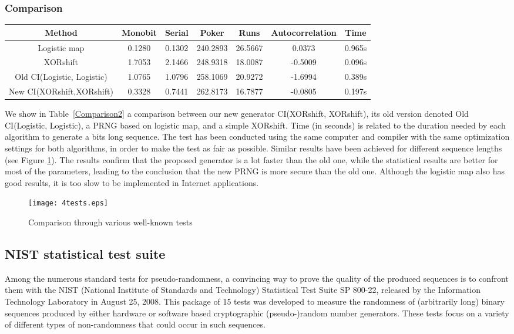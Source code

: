 \documentclass[10pt, a4paper, conference, compsocconf]{IEEEtran}
\begin{document}
\subsubsection{Comparison}
\begin{table*}[!t]
\renewcommand{\arraystretch}{1.3}
\caption{Comparison with Old CI(Logistic, Logistic) for a  bits sequence}
\label{Comparison2}
\centering
  \begin{tabular}{ccccccc}
    \hline
Method & Monobit & Serial & Poker & Runs & Autocorrelation & Time  \\ \hline
Logistic map &0.1280&0.1302&240.2893&26.5667&0.0373&0.965s \\
XORshift &1.7053&2.1466&248.9318&18.0087&-0.5009&0.096s \\
Old CI(Logistic, Logistic) &1.0765&1.0796&258.1069&20.9272&-1.6994&0.389s \\
New CI(XORshift,XORshift) &0.3328&0.7441&262.8173&16.7877&-0.0805&0.197s\\
    \hline
  \end{tabular}
\end{table*}
We show in Table~\ref{Comparison2} a comparison between our new generator CI(XORshift, XORshift), its old version denoted Old CI(Logistic, Logistic), a PRNG based on logistic map, and a simple XORshift. Time (in seconds) is related to the duration needed by each algorithm to generate a  bits long sequence. The test has been conducted using the same computer and compiler with the same optimization settings for both algorithms, in order to make the test as fair as possible. Similar results have been achieved for different sequence lengths (see Figure \ref{Comparison1}).
The results confirm that the proposed generator is a lot faster than the old one, while the statistical results are better for most of the parameters, leading to the conclusion that the new PRNG is more secure than the old one. Although the logistic map also has good results, it is too slow to be implemented in Internet applications.


\begin{figure}
\centering
\texttt{[image: 4tests.eps]}
\caption{Comparison through various well-known tests}
\label{Comparison1}
\end{figure}


\subsection{NIST statistical test suite}
Among the numerous standard tests for pseudo-randomness, a convincing way to prove the quality of the produced sequences is to confront them with the NIST (National Institute of  Standards and Technology) Statistical Test Suite SP 800-22, released by the Information Technology Laboratory in August 25, 2008. This package of 15 tests was developed to measure the randomness of (arbitrarily long) binary sequences produced by either hardware or software based cryptographic (pseudo-)random number generators. These tests focus on a variety of different types of non-randomness that could occur in such sequences.
\end{document}
